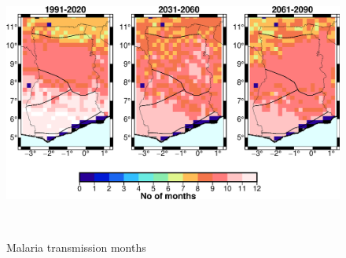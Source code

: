 \documentclass[utf8]{FrontiersinHarvard} %
\begin{document}
\begin{figure}[ht]
\begin{center}
\includegraphics[width=15cm,height=9cm]{trans_months_MPI-M-MPI-ESM-LR_biascorrected.eps}
\caption{Malaria transmission months}
\label{fig:3:4}
\end{center}
\end{figure}
\end{document}
